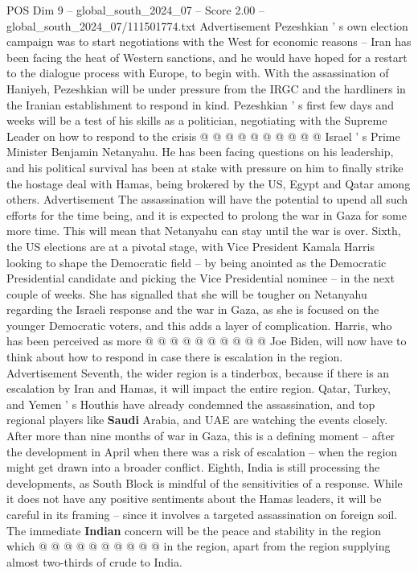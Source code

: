 \begin{textsample}{POS Dim 9 – global\_south\_2024\_07 – Score 2.00 – global\_south\_2024\_07/111501774.txt}
Advertisement Pezeshkian ' s own election campaign was to start negotiations with the West for economic reasons -- Iran has been facing the heat of Western sanctions, and he would have hoped for a restart to the dialogue process with Europe, to begin with.
With the assassination of Haniyeh, Pezeshkian will be under pressure from the IRGC and the hardliners in the Iranian establishment to respond in kind.
Pezeshkian ' s first few days and weeks will be a test of his skills as a politician, negotiating with the Supreme Leader on how to respond to the crisis @ @ @ @ @ @ @ @ @ @ Israel ' s Prime Minister Benjamin Netanyahu.
He has been facing questions on his leadership, and his political survival has been at stake with pressure on him to finally strike the hostage deal with Hamas, being brokered by the US, Egypt and Qatar among others.
Advertisement The assassination will have the potential to upend all such efforts for the time being, and it is expected to prolong the war in Gaza for some more time.
This will mean that Netanyahu can stay until the war is over.
Sixth, the US elections are at a pivotal stage, with Vice President Kamala Harris looking to shape the Democratic field -- by being anointed as the Democratic Presidential candidate and picking the Vice Presidential nominee -- in the next couple of weeks.
She has signalled that she will be tougher on Netanyahu regarding the Israeli response and the war in Gaza, as she is focused on the younger Democratic voters, and this adds a layer of complication.
Harris, who has been perceived as more @ @ @ @ @ @ @ @ @ @ Joe Biden, will now have to think about how to respond in case there is escalation in the region.
Advertisement Seventh, the wider region is a tinderbox, because if there is an escalation by Iran and Hamas, it will impact the entire region.
Qatar, Turkey, and Yemen ' s Houthis have already condemned the assassination, and top regional players like \textbf{Saudi} Arabia, and UAE are watching the events closely.
After more than nine months of war in Gaza, this is a defining moment -- after the development in April when there was a risk of escalation -- when the region might get drawn into a broader conflict.
Eighth, India is still processing the developments, as South Block is mindful of the sensitivities of a response.
While it does not have any positive sentiments about the Hamas leaders, it will be careful in its framing -- since it involves a targeted assassination on foreign soil.
The immediate \textbf{Indian} concern will be the peace and stability in the region which @ @ @ @ @ @ @ @ @ @ in the region, apart from the region supplying almost two-thirds of crude to India.

\end{textsample}
